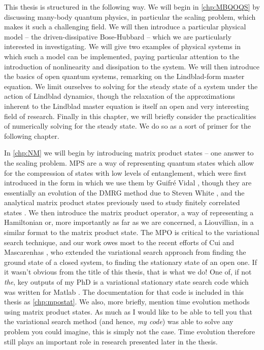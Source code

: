 This thesis is structured in the following way. We will begin in \cref{chp:MBQOQS} by discussing many-body quantum physics, in particular the scaling problem, which makes it such a challenging field. We will then introduce a particular physical model -- the driven-dissipative Bose-Hubbard -- which we are particularly interested in investigating. We will give two examples of physical systems in which such a model can be implemented, paying particular attention to the introduction of nonlinearity and dissipation to the system. We will then introduce the basics of open quantum systems, remarking on the Lindblad-form master equation. We limit ourselves to solving for the steady state of a system under the action of Lindblad dynamics, though the relaxation of the approximations inherent to the Lindblad master equation is itself an open and very interesting field of research. Finally in this chapter, we will briefly consider the practicalities of numerically solving for the steady state. We do so as a sort of primer for the following chapter.

In \cref{chp:NM} we will begin by introducing matrix product states -- one answer to the scaling problem. MPS are a way of representing quantum states which allow for the compression of states with low levels of entanglement, which were first introduced in the form in which we use them by Guifr\'{e} Vidal \cite{Vidal2003,Vidal2004}, though they are essentially an evolution of the DMRG method due to Steven White \cite{White1992,White1993}, and the analytical matrix product states previously used to study finitely correlated states \cite{Affleck1987}. We then introduce the matrix product operator, a way of representing a Hamiltonian or, more importantly as far as we are concerned, a Liouvillian, in a similar format to the matrix product state. The MPO is critical to the variational search technique, and our work owes most to the recent efforts of Cui \cite{Cui2015} and Mascarenhas \cite{Mascarenhas2015}, who extended the variational search approach from finding the ground state of a closed system, to finding the stationary state of an open one. If it wasn't obvious from the title of this thesis, that is what we do! One of, if not \emph{the}, key outputs of my PhD is a variational stationary state search code \cite{otb:gitVSSS} which was written for Matlab \cite{MATLAB}. The documentation for that code is included in this thesis as \cref{chp:mpostat}. We also, more briefly, mention time evolution methods using matrix product states. As much as I would like to be able to tell you that the variational search method (and hence, \emph{my code}) was able to solve any problem you could imagine, this is simply not the case. Time evolution therefore still plays an important role in research presented later in the thesis.

